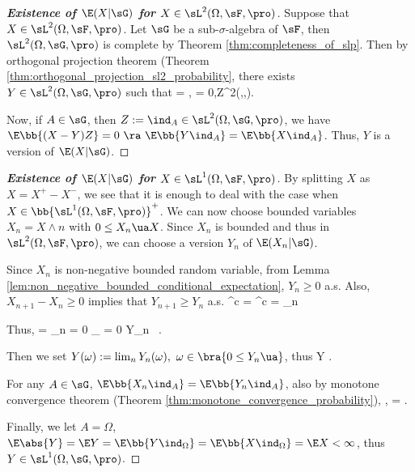\begin{proof}[\bf Existence of $\E(X|\sG)$ for $X\in \sL^2(\Omega,\sF,\pro)$]
Suppose that $X\in \sL^2(\Omega,\sF,\pro)$. Let $\sG$ be a sub-$\sigma$-algebra of $\sF$, then $\sL^2(\Omega,\sG,\pro)$ is complete by Theorem \ref{thm:completeness_of_slp}. Then by orthogonal projection theorem (Theorem \ref{thm:orthogonal_projection_sl2_probability}, there exists $Y\in \sL^2(\Omega,\sG,\pro)$ such that
\be
\E{} = \inf {},\quad \quad {} = 0,\quad Z\in \sL^2(\Omega,\sG,\pro).
\ee

Now, if $A\in \sG$, then $Z:=\ind_A\in \sL^2(\Omega,\sG,\pro)$, we have $\E\bb{(X-Y)Z} = 0\ \ra\ \E\bb{Y\ind_A} = \E\bb{X\ind_A}$. Thus, $Y$ is a version of $\E(X|\sG)$.
\end{proof}


\begin{proof}[\bf Existence of $\E(X|\sG)$ for $X\in \sL^1(\Omega,\sF,\pro)$]
By splitting $X$ as $X=X^+ - X^-$, we see that it is enough to deal with the case when $X\in \bb{\sL^1(\Omega,\sF,\pro)}^+$. We can now choose bounded variables $X_n = X\land n$ with $0\leq X_n \ua X$. Since $X_n$ is bounded and thus in $\sL^2(\Omega,\sF,\pro)$, we can choose a version $Y_n$ of $\E(X_n|\sG)$.

Since $X_n$ is non-negative bounded random variable, from Lemma \ref{lem:non_negative_bounded_conditional_expectation}, $Y_n \geq 0$ a.s. Also, $X_{n+1} - X_n \geq 0$ implies that $Y_{n+1} \geq Y_n$ a.s.
\be
{}^c = ^c = \bigcup_n 
\ee

Thus,
\be
\pro{} = \pro{} \leq \sum_n \pro {} = 0 \cdot \underbrace{\infty}_{} = 0 \quad\ra{}\leq Y_n \ua \ .
\ee

Then we set $Y(\omega) := \lim_n Y_n(\omega),\ \omega \in \bra{0\leq Y_n \ua}$, thus
\be
Y .
\ee

For any $A \in \sG$, $\E\bb{X_n\ind_A} = \E\bb{Y_n\ind_A}$, also by monotone convergence theorem (Theorem \ref{thm:monotone_convergence_probability}),
\be
\E{} \to \E{},\quad\quad \E{} \to \E{}\quad\ra\quad \E{} = \E{}.
\ee

Finally, we let $A = \Omega$, $\E\abs{Y} = \E Y = \E\bb{Y \ind_\Omega} = \E\bb{X \ind_\Omega} = \E X < \infty$, thus $Y \in \sL^1(\Omega,\sG,\pro)$.
\end{proof}

